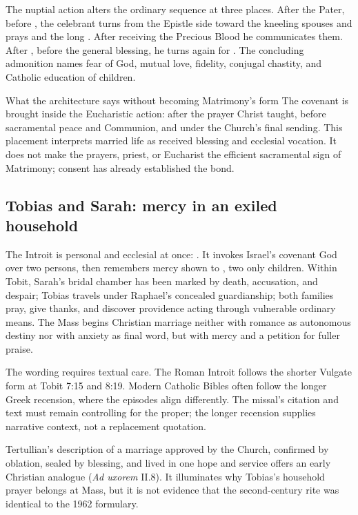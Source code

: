 \begin{deepstudy}
The nuptial action alters the ordinary sequence at three places. After the Pater, before , the celebrant turns from the Epistle side toward the kneeling spouses and prays  and the long . After receiving the Precious Blood he communicates them. After , before the general blessing, he turns again for . The concluding admonition names fear of God, mutual love, fidelity, conjugal chastity, and Catholic education of children.

\begin{massbox}{What the architecture says without becoming Matrimony's form}
The covenant is brought inside the Eucharistic action: after the prayer Christ taught, before sacramental peace and Communion, and under the Church's final sending. This placement interprets married life as received blessing and ecclesial vocation. It does not make the prayers, priest, or Eucharist the efficient sacramental sign of Matrimony; consent has already established the bond.
\end{massbox}

\sectionguard
\subsection*{Tobias and Sarah: mercy in an exiled household\enspace{}}

The Introit is personal and ecclesial at once: . It invokes Israel's covenant God over two persons, then remembers mercy shown to , two only children. Within Tobit, Sarah's bridal chamber has been marked by death, accusation, and despair; Tobias travels under Raphael's concealed guardianship; both families pray, give thanks, and discover providence acting through vulnerable ordinary means. The Mass begins Christian marriage neither with romance as autonomous destiny nor with anxiety as final word, but with mercy and a petition for fuller praise.

The wording requires textual care. The Roman Introit follows the shorter Vulgate form at Tobit 7:15 and 8:19. Modern Catholic Bibles often follow the longer Greek recension, where the episodes align differently. The missal's citation and text must remain controlling for the proper; the longer recension supplies narrative context, not a replacement quotation.

Tertullian's description of a marriage approved by the Church, confirmed by oblation, sealed by blessing, and lived in one hope and service offers an early Christian analogue (\emph{Ad uxorem} II.8). It illuminates why Tobias's household prayer belongs at Mass, but it is not evidence that the second-century rite was identical to the 1962 formulary.


\end{deepstudy}
